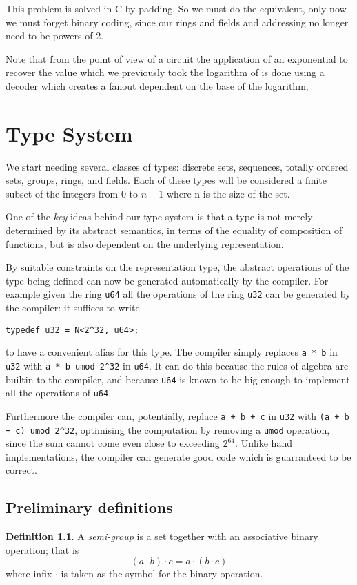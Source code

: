 \documentclass[oneside]{book}
\theoremstyle{plain}
\theoremstyle{definition}
\newtheorem{definition}{Definition}
\theoremstyle{plain}
\begin{document}
This problem is solved in C by padding. So we must do the equivalent,
only now we must forget binary coding, since our rings and fields
and addressing no longer need to be powers of 2.

Note that from the point of view of a circuit the application of an exponential
to recover the value which we previously took the logarithm of is done
using a decoder which creates a fanout dependent on the base of the logarithm,

\chapter{Type System}
We start needing  several classes of types: discrete sets, sequences, totally ordered
sets, groups, rings, and fields.
Each of these types will be considered a finite subset of the integers 
from 0 to $n-1$ where n is the size of the set.

One of the {\em key} ideas behind our type system is that a type is not merely
determined by its abstract semantics, in terms of the equality of 
composition of functions, but is also dependent on the underlying representation.

By suitable constraints on the representation type, the abstract operations
of the type being defined can now be generated automatically by the compiler.
For example given the ring \verb$u64$ all the operations of the ring \verb$u32$
can be generated by the compiler: it suffices to write
\begin{verbatim}
typedef u32 = N<2^32, u64>;
\end{verbatim}
to have a convenient alias for this type. The compiler simply replaces \verb$a * b$ in
\verb$u32$ with \verb$a * b umod 2^32$ in \verb$u64$. It can do this because the rules
of algebra are builtin to the compiler, and because \verb$u64$ is known to be big enough
to implement all the operations of \verb$u64$.

Furthermore the compiler can, potentially, replace \verb$a + b + c$ in \verb$u32$
with \verb$(a + b + c) umod 2^32$, optimising the computation by removing a \verb$umod$
operation, since the sum cannot come even close to exceeding $2^64$. Unlike hand 
implementations, the compiler can generate good code which is guarranteed to be correct.




\section{Preliminary definitions}
\begin{definition}
A {\em semi-group} is a set together with an associative binary operation; that is
$$(a \cdot b)\cdot c = a \cdot (b \cdot c)$$
where infix $\cdot$ is taken as the symbol for the binary operation.
\end{definition}
\end{document}
